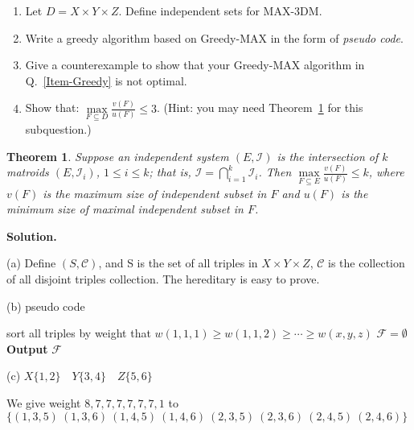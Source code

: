 \documentclass[12pt,a4paper]{article}
\newtheorem{theorem}{Theorem}
\theoremstyle{definition}
\begin{document}
\begin{enumerate}
    \begin{enumerate}
    	\item Let $D = X \times Y \times Z$. Define independent sets for MAX-3DM.
    	\item Write a greedy algorithm based on Greedy-MAX in the form of \emph{pseudo code}. \label{Item-Greedy}
    	\item Give a counterexample to show that your Greedy-MAX algorithm in Q.~\ref{Item-Greedy} is not optimal.
    	\item Show that: $\max\limits_{F \subseteq D} \frac{v(F)}{u(F)} \leq 3$. {\color{blue}(Hint: you may need Theorem~\ref{Thm-Intersect} for this subquestion.)} 
    \end{enumerate}
    \begin{theorem} \label{Thm-Intersect}
        Suppose an independent system $(E, \mathcal{I})$ is the intersection of $k$ matroids $\left(E, \mathcal{I}_{i}\right)$, $1 \leq i \leq k$; that is, $\mathcal{I}=\bigcap_{i=1}^{k} \mathcal{I}_{i}$. Then $\max\limits_{F \subseteq E} \frac{v(F)}{u(F)} \leq k$, where $v(F)$ is the maximum size of independent subset in $F$ and $u(F)$ is the minimum size of maximal independent subset in $F$.
    \end{theorem}
 
	\textbf{Solution.}
	
	(a) Define $(S,\mathcal{C})$, and S is the set of all triples in $X\times Y \times Z$, $\mathcal{C}$ is the collection of all disjoint triples collection. The hereditary is easy to prove.

	(b) pseudo code 

	\begin{algorithm}[H]
		\BlankLine
		sort all triples by weight that $w(1,1,1)\ge w(1,1,2)\ge \cdots \ge w(x, y , z)$\;
		$\mathcal{F}=\emptyset$ \;
		\textbf{Output} $\mathcal{F}$
	\end{algorithm}

	(c) $X\{1,2\}\quad Y\{3,4\} \quad Z\{5,6\}$

	We give weight $8,7,7,7,7,7,7,1$ to $\{(1,3,5)\ (1,3,6)\ (1,4,5)\ (1,4,6)\ (2,3,5)\ (2,3,6)\ (2,4,5)\ (2,4,6)\}$


\end{enumerate}
\end{document}
